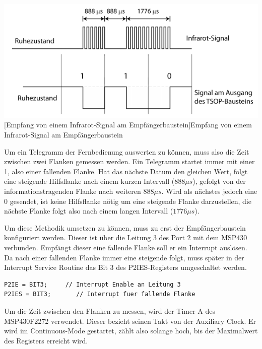 \documentclass[12pt,a4paper,bibliography=totocnumbered,listof=totocnumbered]{scrartcl}
\begin{document}
\vspace{1em}
\begin{minipage}{\linewidth}
	\centering
	\includegraphics[width=1\linewidth]{img/Infrarot.png}
	[Empfang von einem Infrarot-Signal am Empfängerbaustein]{Empfang von einem Infrarot-Signal am Empfängerbaustein\footnotemark}
	\label{fig:Infrarot}
\end{minipage}


Um ein Telegramm der Fernbedienung auswerten zu können, muss also die Zeit zwischen zwei Flanken gemessen werden. Ein Telegramm startet immer mit einer 1, also einer fallenden Flanke. Hat das nächste Datum den gleichen Wert, folgt eine steigende Hilfsflanke nach einem kurzen Intervall (\(888{\mu}s\)), gefolgt von der informationstragenden Flanke nach weiteren \(888{\mu}s\). Wird als nächstes jedoch eine 0 gesendet, ist keine Hilfsflanke nötig um eine steigende Flanke darzustellen, die nächste Flanke folgt also nach einem langen Intervall (\(1776{\mu}s\)).

Um diese Methodik umsetzen zu können, muss zu erst der Empfängerbaustein konfiguriert werden. Dieser ist über die Leitung 3 des Port 2 mit dem MSP430 verbunden. Empfängt dieser eine fallende Flanke soll er ein Interrupt auslösen. Da nach einer fallenden Flanke immer eine steigende folgt, muss später in der Interrupt Service Routine das Bit 3 des P2IES-Registers umgeschaltet werden.

\vspace{1em}
\begin{lstlisting}[caption=Konfiguration Port 2]
P2IE = BIT3;     // Interrupt Enable an Leitung 3
P2IES = BIT3;		// Interrupt fuer fallende Flanke
\end{lstlisting}

Um die Zeit zwischen den Flanken zu messen, wird der Timer A des MSP430F2272 verwendet. Dieser bezieht seinen Takt von der Auxiliary Clock. Er wird im Continuous-Mode gestartet, zählt also solange hoch, bis der Maximalwert des Registers erreicht wird.
\end{document}
